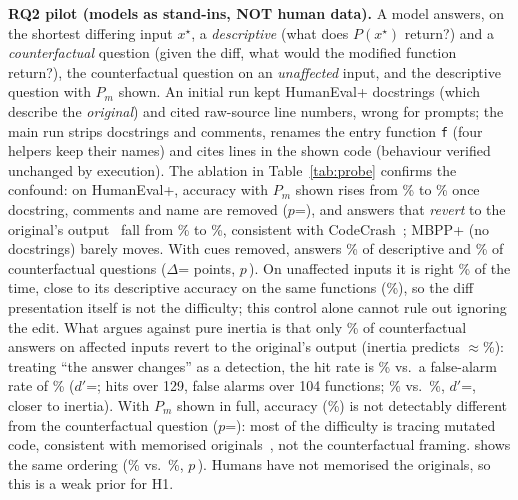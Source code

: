 \textbf{RQ2 pilot (models as stand-ins, NOT human data).} A model answers, on the shortest differing input $x^\star$, a \emph{descriptive}
(what does $P(x^\star)$ return?) and a \emph{counterfactual} question (given the diff, what would the modified function
return?), the counterfactual question on an \emph{unaffected} input, and the descriptive question with $P_m$ shown. An initial run kept HumanEval+ docstrings (which
describe the \emph{original}) and cited raw-source line numbers, wrong for \SNLineMismatchRoundone{} prompts; the
main run strips docstrings and comments, renames the entry function \texttt{f} (four helpers keep their names) and
cites lines in the shown code (behaviour verified unchanged by execution). The ablation in Table~\ref{tab:probe} confirms the confound: on HumanEval+, accuracy with $P_m$
shown rises from \PzAblPonefourDESCMUTHeB\% to \PzAblPonefourDESCMUTHeA\% once docstring, comments and name are removed ($p$=\SAblPonefourDESCMUTHePHolm),
and answers that \emph{revert} to the original's output~\cite{yang2025reversion} fall from \PzProbePonefourdDESCMUTHeReverts\%
to \PzProbePonefoursDESCMUTHeReverts\%, consistent with CodeCrash~\cite{lam2025codecrash}; MBPP+ (no docstrings) barely moves.
With cues removed, \GenModel{} answers \PzProbePonefoursDESC\% of descriptive and \PzProbePonefoursCF\% of counterfactual
questions ($\Delta$=\PProbePonefoursDESCVsCFD{} points, $p$\,\SProbePonefoursDESCVsCFPHolm). On unaffected inputs it is
right \PzProbePonefoursCFCTRL\% of the time, close to its descriptive accuracy on the same functions
(\PzProbePonefoursDESCOnCtrl\%), so the diff presentation itself is not the difficulty; this control alone cannot rule out
ignoring the edit. What argues against pure inertia is that only \PzProbePonefoursCFReverts\% of counterfactual answers on
affected inputs revert to the original's output (inertia predicts $\approx$\PzProbePonefoursDESC\%): treating ``the answer
changes'' as a detection, the hit rate is \PProbePonefoursHit\% vs.\ a false-alarm rate of \PProbePonefoursFa\%
($d'$=\SProbePonefoursDprime; hits over 129, false alarms over 104 functions; \ProbeB{} \PProbePsevensHit\% vs.\ \PProbePsevensFa\%, $d'$=\SProbePsevensDprime, closer to
inertia). With $P_m$ shown in full, accuracy (\PzProbePonefoursDESCMUT\%) is not detectably different from the
counterfactual question ($p$=\SProbePonefoursDESCMUTVsCFPHolm): most of the difficulty is tracing mutated code, consistent
with memorised originals~\cite{yang2025reversion}, not the counterfactual framing. \ProbeB{} shows the same ordering
(\PzProbePsevensDESC\% vs.\ \PzProbePsevensCF\%, $p$\,\SProbePsevensDESCVsCFPHolm). Humans have not memorised the originals, so this is a weak prior for H1.

